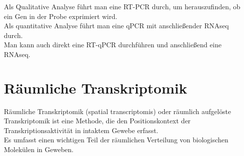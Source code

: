 \begin{mechanism}[title=Sie wollen die Genexpression in einer prokaryotischen Zelle quantitativ und qualitativ messen.\\ Wie gehen Sie vor?]
Als Qualitative Analyse führt man eine RT-PCR durch, um herauszufinden, ob ein Gen in der Probe exprimiert wird. \\
Als quantitative Analyse führt man eine qPCR mit anschließender RNAseq durch.  \\ \newline
Man kann auch direkt eine RT-qPCR durchführen und anschließend eine RNAseq. 
\end{mechanism}

\section{Räumliche Transkriptomik}%
Räumliche Transkriptomik (spatial transcriptomis) oder räumlich aufgelöste Transkriptomik ist eine Methode, die den Positionskontext der Transkriptionsaktivität in intaktem Gewebe erfasst. \\
Es umfasst einen wichtigen Teil der räumlichen Verteilung von biologischen Molekülen in Geweben.
